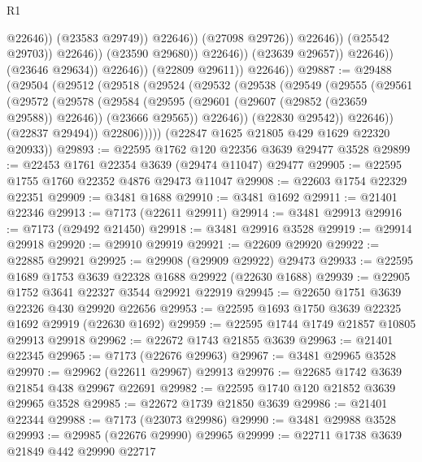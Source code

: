 \begin{lexlean}{R1}
\begin{coremodule}
                                                  @22646))
                                              (@23583 @29749))
                                            @22646))
                                        (@27098 @29726))
                                      @22646))
                                  (@25542 @29703))
                                @22646))
                            (@23590 @29680))
                          @22646))
                      (@23639 @29657))
                    @22646))
                (@23646 @29634))
              @22646))
          (@22809 @29611))
        @22646))
@29887 := @29488
    (@29504
      (@29512
        (@29518
          (@29524
            (@29532
              (@29538
                (@29549
                  (@29555
                    (@29561
                      (@29572
                        (@29578
                          (@29584
                            (@29595
                              (@29601 (@29607 (@29852 (@23659 @29588)) @22646))
                              (@23666 @29565))
                            @22646))
                        (@22830 @29542))
                      @22646))
                  (@22837 @29494))
                @22806)))))
      (@22847 @1625 @21805 @429 @1629 @22320 @20933))
@29893 := @22595 @1762 @120 @22356 @3639 @29477 @3528
@29899 := @22453 @1761 @22354 @3639 (@29474 @11047) @29477
@29905 := @22595 @1755 @1760 @22352 @4876 @29473 @11047
@29908 := @22603 @1754 @22329 @22351
@29909 := @3481 @1688
@29910 := @3481 @1692
@29911 := @21401 @22346
@29913 := @7173 (@22611 @29911)
@29914 := @3481 @29913
@29916 := @7173 (@29492 @21450)
@29918 := @3481 @29916 @3528
@29919 := @29914 @29918
@29920 := @29910 @29919
@29921 := @22609 @29920
@29922 := @22885 @29921
@29925 := @29908 (@29909 @29922) @29473
@29933 := @22595 @1689 @1753 @3639 @22328 @1688 @29922 (@22630 @1688)
@29939 := @22905 @1752 @3641 @22327 @3544 @29921 @22919
@29945 := @22650 @1751 @3639 @22326 @430 @29920 @22656
@29953 := @22595 @1693 @1750 @3639 @22325 @1692 @29919 (@22630 @1692)
@29959 := @22595 @1744 @1749 @21857 @10805 @29913 @29918
@29962 := @22672 @1743 @21855 @3639
@29963 := @21401 @22345
@29965 := @7173 (@22676 @29963)
@29967 := @3481 @29965 @3528
@29970 := @29962 (@22611 @29967) @29913
@29976 := @22685 @1742 @3639 @21854 @438 @29967 @22691
@29982 := @22595 @1740 @120 @21852 @3639 @29965 @3528
@29985 := @22672 @1739 @21850 @3639
@29986 := @21401 @22344
@29988 := @7173 (@23073 @29986)
@29990 := @3481 @29988 @3528
@29993 := @29985 (@22676 @29990) @29965
@29999 := @22711 @1738 @3639 @21849 @442 @29990 @22717

\end{coremodule}
\end{lexlean}
